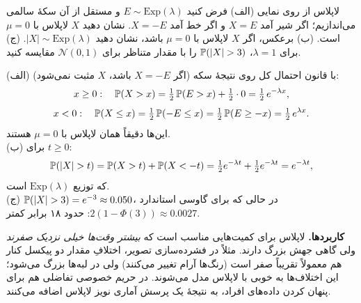 \begin{figblock}

\end{figblock}

\begin{example}[label=ex:laplace]{لاپلاس از روی نمایی}
(الف) فرض کنید $E\sim\mathrm{Exp}(\lambda)$ و مستقل از آن سکهٔ سالمی می‌اندازیم؛ اگر شیر آمد $X=E$ و اگر خط آمد $X=-E$. نشان دهید $X$ لاپلاس با $\mu=0$ است. (ب) برعکس، اگر $X$ لاپلاس با $\mu=0$ باشد، نشان دهید $|X|\sim\mathrm{Exp}(\lambda)$. (ج) برای $\lambda=1$، $\P(|X|>3)$ را با مقدار متناظر برای $\mathcal N(0,1)$ مقایسه کنید.
\begin{solution}
(الف) با قانون احتمال کل روی نتیجهٔ سکه (اگر $X=-E$ باشد، $X$ مثبت نمی‌شود):
\[ x\ge0:\quad \P(X>x)=\tfrac12\,\P(E>x)+\tfrac12\cdot0=\tfrac12\,e^{-\lambda x}, \]
\[ x<0:\quad \P(X\le x)=\tfrac12\,\P(-E\le x)=\tfrac12\,\P(E\ge-x)=\tfrac12\,e^{\lambda x}. \]
این‌ها دقیقاً همان  لاپلاس با $\mu=0$ هستند.\\
(ب) برای $t\ge0$:
\[ \P(|X|>t)=\P(X>t)+\P(X<-t)=\tfrac12e^{-\lambda t}+\tfrac12e^{-\lambda t}=e^{-\lambda t}, \]
که  توزیع $\mathrm{Exp}(\lambda)$ است.\\
(ج) $\P(|X|>3)=e^{-3}\approx0.050$، در حالی که برای گاوسی استاندارد $2(1-\Phi(3))\approx0.0027$: حدود ۱۸ برابر کمتر.
\end{solution}
\end{example}

\begin{note}
\textbf{کاربردها.} لاپلاس برای کمیت‌هایی مناسب است که \emph{بیشتر وقت‌ها خیلی نزدیک صفرند} ولی گاهی جهش بزرگ دارند. مثلاً در فشرده‌سازی تصویر، اختلافِ مقدار دو پیکسل کنار هم معمولاً تقریباً صفر است (رنگ‌ها آرام تغییر می‌کنند) ولی در لبه‌ها بزرگ می‌شود؛ این اختلاف‌ها به خوبی با لاپلاس مدل می‌شوند. در حریم خصوصی تفاضلی هم برای پنهان کردن داده‌های افراد، به نتیجهٔ یک پرسش آماری نویز لاپلاس اضافه می‌کنند.
\end{note}

